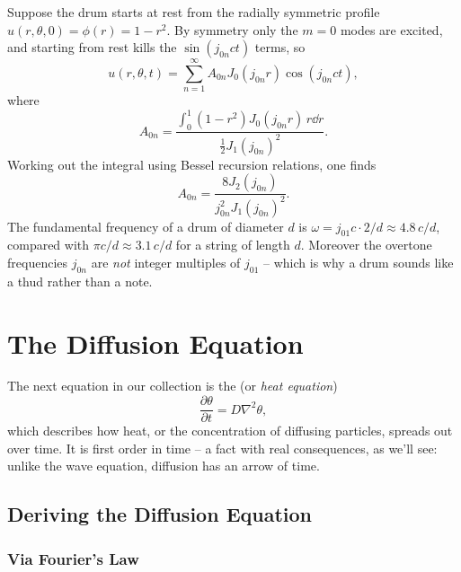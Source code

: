 \documentclass[a4paper]{scrartcl}
\begin{document}
\begin{example}
    Suppose the drum starts at rest from the radially symmetric profile $u(r, \theta, 0) = \phi(r) = 1 - r^2$.
    By symmetry only the $m = 0$ modes are excited, and starting from rest kills the $\sin(j_{0n}ct)$ terms, so
    $$
    u(r, \theta, t) = \sum_{n = 1}^{\infty} A_{0n} J_0 (j_{0n} r) \cos (j_{0n} c t),
    $$
    where
    $$
    A_{0n} = \frac{\int_0^1 (1 - r^2) J_0(j_{0n} r)\, r \dd r}{\frac{1}{2}J_1(j_{0n})^2}.
    $$
    Working out the integral using Bessel recursion relations, one finds
    $$
    A_{0n} = \frac{8 J_2(j_{0n})}{j_{0n}^2 J_1(j_{0n})^2}.
    $$
    The fundamental frequency of a drum of diameter $d$ is $\omega = j_{01}c \cdot 2/d \approx 4.8\, c/d$, compared with $\pi c/d \approx 3.1\, c/d$ for a string of length $d$. Moreover the overtone frequencies $j_{0n}$ are \emph{not} integer multiples of $j_{01}$ -- which is why a drum sounds like a thud rather than a note.
\end{example}

\section{The Diffusion Equation}

The next equation in our collection is the  (or \emph{heat equation})
$$
\frac{\partial \theta}{\partial t} = D \nabla^2 \theta,
$$
which describes how heat, or the concentration of diffusing particles, spreads out over time. It is first order in time -- a fact with real consequences, as we'll see: unlike the wave equation, diffusion has an arrow of time.

\subsection{Deriving the Diffusion Equation}

\subsubsection*{Via Fourier's Law}
\end{document}
